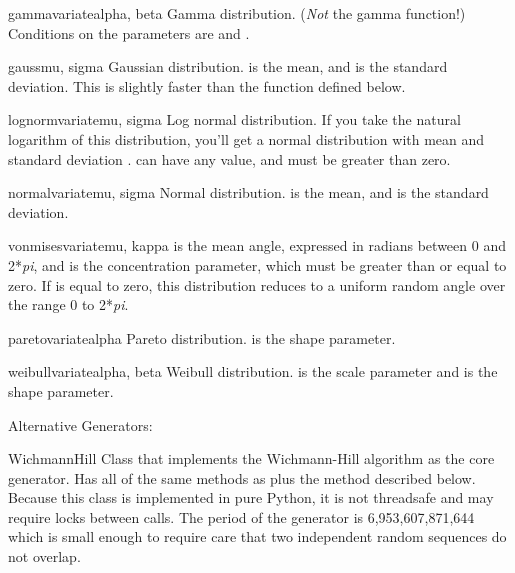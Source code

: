 \begin{funcdesc}{gammavariate}{alpha, beta}
  Gamma distribution.  (\emph{Not} the gamma function!)  Conditions on
  the parameters are  and .
\end{funcdesc}

\begin{funcdesc}{gauss}{mu, sigma}
  Gaussian distribution.   is the mean, and  is the
  standard deviation.  This is slightly faster than the
   function defined below.
\end{funcdesc}

\begin{funcdesc}{lognormvariate}{mu, sigma}
  Log normal distribution.  If you take the natural logarithm of this
  distribution, you'll get a normal distribution with mean 
  and standard deviation .   can have any value,
  and  must be greater than zero.
\end{funcdesc}

\begin{funcdesc}{normalvariate}{mu, sigma}
  Normal distribution.   is the mean, and  is the
  standard deviation.
\end{funcdesc}

\begin{funcdesc}{vonmisesvariate}{mu, kappa}
   is the mean angle, expressed in radians between 0 and
  2*\emph{pi}, and  is the concentration parameter, which
  must be greater than or equal to zero.  If  is equal to
  zero, this distribution reduces to a uniform random angle over the
  range 0 to 2*\emph{pi}.
\end{funcdesc}

\begin{funcdesc}{paretovariate}{alpha}
  Pareto distribution.   is the shape parameter.
\end{funcdesc}

\begin{funcdesc}{weibullvariate}{alpha, beta}
  Weibull distribution.   is the scale parameter and
   is the shape parameter.
\end{funcdesc}

Alternative Generators:

\begin{classdesc}{WichmannHill}{}
Class that implements the Wichmann-Hill algorithm as the core generator.
Has all of the same methods as  plus the 
method described below.  Because this class is implemented in pure
Python, it is not threadsafe and may require locks between calls.  The
period of the generator is 6,953,607,871,644 which is small enough to
require care that two independent random sequences do not overlap.
\end{classdesc}

